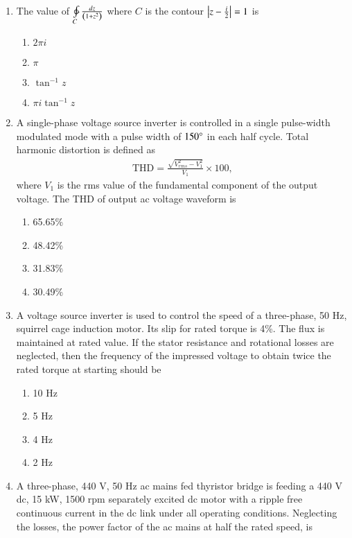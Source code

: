 \documentclass[journal]{IEEEtran}
\begin{document}
\begin{enumerate}
\begin{enumerate}
\end{enumerate}
\item The value of $\ointctrclockwise\limits_{C} \frac{dz}{\brak{1 + z^2}}$ where $C$ is the contour $\left\vert z - \frac{i}{2}\right\vert = 1$ is
\begin{enumerate}
    \item $2 \pi i$
    \item $\pi$
    \item $\tan^{-1}z$
    \item $\pi i \tan^{-1}z$ \\
\end{enumerate}
\item A single-phase voltage source inverter is controlled in a single pulse-width modulated mode with a pulse width of $150\degree$ in each half cycle. Total harmonic distortion is defined as 
\begin{align*}
    \text{THD} = \frac{\sqrt{V_{rms}^2 - V_1^2}}{V_1} \times 100, 
\end{align*}where $V_1$ is the rms value of the fundamental component of the output voltage. The THD of output ac voltage waveform is
\begin{enumerate}
    \item 65.65\%
    \item 48.42\%
    \item 31.83\%
    \item 30.49\% \\
\end{enumerate}
\item A voltage source inverter is used to control the speed of a three-phase, 50 Hz, squirrel cage induction motor. Its slip for rated torque is 4\%. The flux is maintained at rated value. If the stator resistance and rotational losses are neglected, then the frequency of the impressed voltage to obtain twice the rated torque at starting should be
 \begin{enumerate}
     \item 10 Hz
     \item 5 Hz
     \item 4 Hz
     \item 2 Hz \\
 \end{enumerate}
\item A three-phase, 440 V, 50 Hz ac mains fed thyristor bridge is feeding a 440 V dc, 15 kW, 1500 rpm separately excited dc motor with a ripple free continuous current in the dc link under all operating conditions. Neglecting the losses, the power factor of the ac mains at half the rated speed, is

\end{enumerate}
\end{document}
